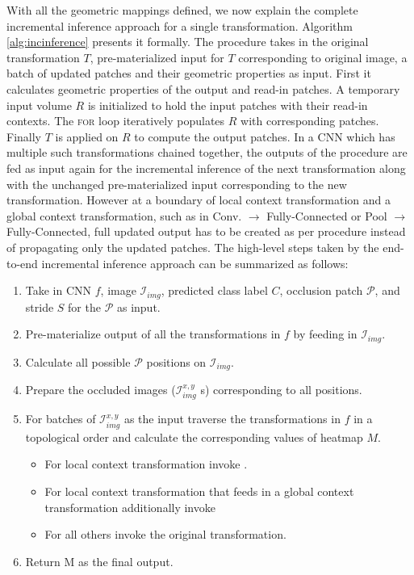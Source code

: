 With all the geometric mappings defined, we now explain the complete incremental inference approach for a single transformation. Algorithm \ref{alg:incinference} presents it formally.
The  procedure takes in the original transformation $T$, pre-materialized input for $T$ corresponding to original image, a batch of updated patches and their geometric properties as input.
First it calculates geometric properties of the output and read-in patches.
A temporary input volume $R$ is initialized to hold the input patches with their read-in contexts.
The \textsc{for} loop iteratively populates $R$ with corresponding patches.
Finally $T$ is applied on $R$ to compute the output patches.
In a CNN which has multiple such transformations chained together, the outputs of the  procedure are fed as input again for the incremental inference of the next transformation along with the unchanged pre-materialized input corresponding to the new transformation.
However at a boundary of local context transformation and a global context transformation, such as in Conv. $\rightarrow$ Fully-Connected or Pool $\rightarrow$ Fully-Connected, full updated output has to be created as per  procedure instead of propagating only the updated patches.
The high-level steps taken by the end-to-end incremental inference approach can be summarized as follows:

\begin{enumerate}
	\item Take in CNN $f$, image $\mathcal{I}_{img}$, predicted class label $C$, occlusion patch $\mathcal{P}$, and stride $S$ for the $\mathcal{P}$ as input.
	\item Pre-materialize output of all the transformations in $f$ by feeding in $\mathcal{I}_{img}$.
	\item Calculate all possible $\mathcal{P}$ positions on $\mathcal{I}_{img}$.
	\item Prepare the occluded images ($\mathcal{I}^{x,y}_{img}$ s) corresponding to all positions.
	\item For batches of $\mathcal{I}^{x,y}_{img}$ as the input traverse the transformations in $f$ in a topological order and calculate the corresponding values of heatmap $M$.
	\begin{itemize}
		\item For local context transformation invoke .
		\item For local context transformation that feeds in a global context transformation additionally invoke 
		\item For all others invoke the original transformation.
	\end{itemize}
	\item Return M as the final output.
\end{enumerate}


